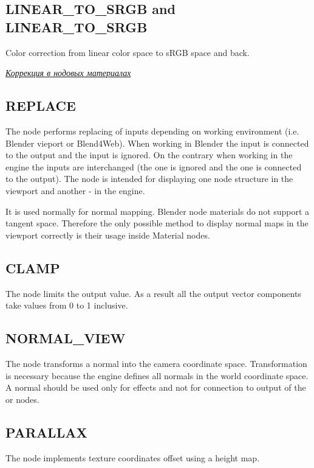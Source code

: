 \documentclass[a4paper,12pt,oneside]{sphinxmanual}
\begin{document}
\subsection{LINEAR\_TO\_SRGB and LINEAR\_TO\_SRGB}
\label{node_materials:linear-to-srgb-linear-to-srgb}
Color correction from linear color space to sRGB space and back.




{\hyperref[gamma_alpha:gamma-nodes]{\emph{Коррекция в нодовых материалах}}}




\subsection{REPLACE}
\label{node_materials:replace}
The node performs replacing of inputs depending on working environment (i.e. Blender vieport or Blend4Web). When working in Blender the  input is connected to the  output and the  input is ignored. On the contrary when working in the engine the inputs are interchanged (the  one is ignored and the  one is connected to the output). The node is intended for displaying one node structure in the viewport and another - in the engine.

It is used normally for normal mapping. Blender node materials do not support a tangent space. Therefore the only possible method to display normal maps in the viewport correctly is their usage inside Material nodes.


\subsection{CLAMP}
\label{node_materials:clamp}
The node limits the output value. As a result all the output vector components take values from 0 to 1 inclusive.


\subsection{NORMAL\_VIEW}
\label{node_materials:normal-view}
The node transforms a normal into the camera coordinate space. Transformation is necessary because the engine defines all normals in the world coordinate space. A normal should be used only for effects and not for connection to output of the  or  nodes.


\subsection{PARALLAX}
\label{node_materials:parallax}
The node implements texture coordinates offset using a height map.
\end{document}
